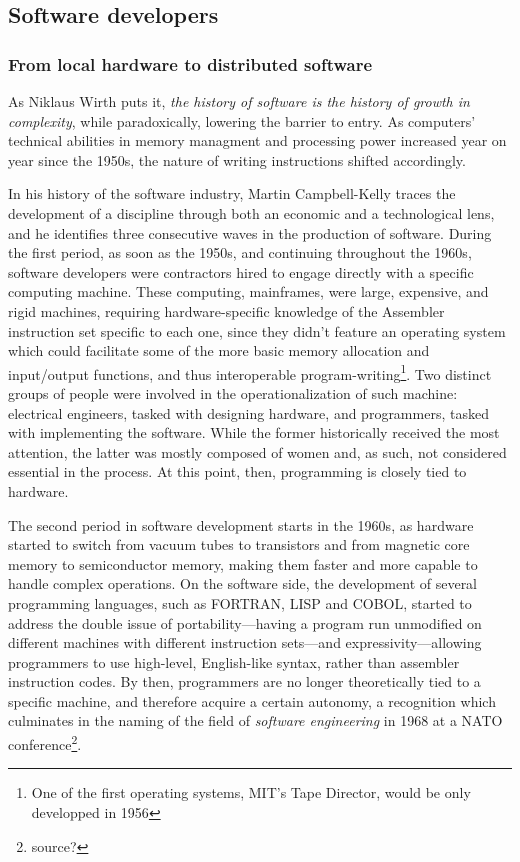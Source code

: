 \subsection{Software developers}

\subsubsection{From local hardware to distributed software}

As Niklaus Wirth puts it, \emph{the history of software is the history of growth in complexity}\cite{wirth_brief_2008}, while paradoxically, lowering the barrier to entry. As computers' technical abilities in memory managment and processing power increased year on year since the 1950s, the nature of writing instructions shifted accordingly.

In his history of the software industry, Martin Campbell-Kelly traces the development of a discipline through both an economic and a technological lens, and he identifies three consecutive waves in the production of software\cite{campbell-kelly_airline_2003}. During the first period, as soon as the 1950s, and continuing throughout the 1960s, software developers were contractors hired to engage directly with a specific computing machine. These computing, mainframes, were large, expensive, and rigid machines, requiring hardware-specific knowledge of the Assembler instruction set specific to each one, since they didn't feature an operating system which could facilitate some of the more basic memory allocation and input/output functions, and thus interoperable program-writing\footnote{One of the first operating systems, MIT's Tape Director, would be only developped in 1956\cite{ross_personal_1986}}. Two distinct groups of people were involved in the operationalization of such machine: electrical engineers, tasked with designing hardware, and programmers, tasked with implementing the software. While the former historically received the most attention\cite{ross_personal_1986}, the latter was mostly composed of women and, as such, not considered essential in the process\cite{light_when_1999}. At this point, then, programming is closely tied to hardware.

The second period in software development starts in the 1960s, as hardware started to switch from vacuum tubes to transistors and from magnetic core memory to semiconductor memory, making them faster and more capable to handle complex operations.  On the software side, the development of several programming languages, such as FORTRAN, LISP and COBOL, started to address the double issue of portability—having a program run unmodified on different machines with different instruction sets—and expressivity—allowing programmers to use high-level, English-like syntax, rather than assembler instruction codes. By then, programmers are no longer theoretically tied to a specific machine, and therefore acquire a certain autonomy, a recognition which culminates in the naming of the field of \emph{software engineering} in 1968 at a NATO conference\footnote{source?}.

